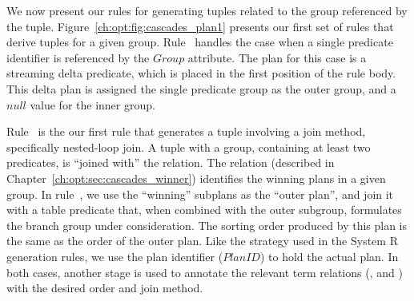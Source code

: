 We now present our rules for generating  tuples related to the group
referenced by the  tuple.  Figure~\ref{ch:opt:fig:cascades_plan1}
presents our first set of rules that derive  tuples for a given group.
Rule~ handles the case when a single predicate identifier is referenced
by the $Group$ attribute.  The plan for this case is a streaming delta
predicate, which is placed in the first position of the rule body.  This delta
plan is assigned the single predicate group as the outer group, and a $null$
value for the inner group.

Rule~ is the our first rule that generates a  tuple involving
a join method, specifically nested-loop join.  A  tuple with a
group, containing at least two predicates, is ``joined with'' the 
relation.  The  relation (described in
Chapter~\ref{ch:opt:sec:cascades_winner}) identifies the winning plans in a
given group.  In rule~, we use the ``winning'' subplans as the ``outer
plan'', and join it with a table predicate that, when combined with the outer
subgroup, formulates the branch group under consideration.  The sorting order
produced by this plan is the same as the order of the outer plan.  Like the
strategy used in the System R  generation rules, we use the plan
identifier ($PlanID$) to hold the actual plan.  In both cases, another stage is
used to annotate the relevant term relations (,
 and ) with the desired order and join method.

